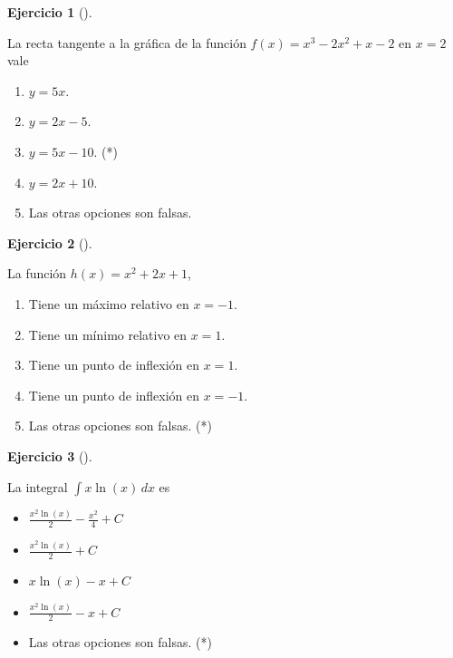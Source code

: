 \documentclass[
  a4paper,
]{scrreport}
\providecommand{\tightlist}{%
  \setlength{\itemsep}{0pt}\setlength{\parskip}{0pt}}\usepackage{longtable,booktabs,array}
\theoremstyle{definition}
\newtheorem{exercise}{Ejercicio}[chapter]
\theoremstyle{remark}
\begin{document}
\begin{exercise}[]\protect\hypertarget{exr-22}{}\label{exr-22}

La recta tangente a la gráfica de la función \(f(x)=x^3-2x^2+x-2\) en
\(x=2\) vale

\begin{enumerate}
\def\labelenumi{\alph{enumi}.}
\item
  \(y=5x\).
\item
  \(y=2x-5\).
\item
  \(y=5x-10\). (*)
\item
  \(y=2x+10\).
\item
  Las otras opciones son falsas.
\end{enumerate}

\end{exercise}

\begin{exercise}[]\protect\hypertarget{exr-23}{}\label{exr-23}

La función \(h(x)=x^2+2x+1\),

\begin{enumerate}
\def\labelenumi{\alph{enumi}.}
\item
  Tiene un máximo relativo en \(x=-1\).
\item
  Tiene un mínimo relativo en \(x=1\).
\item
  Tiene un punto de inflexión en \(x=1\).
\item
  Tiene un punto de inflexión en \(x=-1\).
\item
  Las otras opciones son falsas. (*)
\end{enumerate}

\end{exercise}

\begin{exercise}[]\protect\hypertarget{exr-24}{}\label{exr-24}

La integral \(\int x \ln(x) \, dx\) es

\begin{itemize}
\tightlist
\item
  \(\frac{x^2 \ln(x)}{2} - \frac{x^2}{4} + C\)
\item
  \(\frac{x^2 \ln(x)}{2} + C\)
\item
  \(x \ln(x) - x + C\)
\item
  \(\frac{x^2 \ln(x)}{2} - x + C\)
\item
  Las otras opciones son falsas. (*)
\end{itemize}

\end{exercise}
\end{document}
